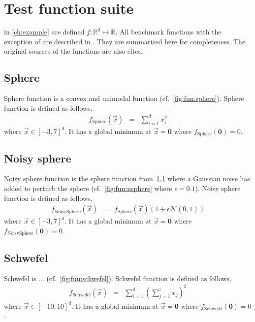 
\chapter{Test function suite}\label{app:fun} 
 in \cref{ch:example} are defined 
$f:\mathbb{R}^d\mapsto\mathbb{R}$.
All benchmark functions with the exception of \cite{citation_needed} are 
described in \cite{citation_needed}. They are summarized here for completeness. 
The original sources of the functions are also cited.

\section{Sphere }\label{app:fun:sphere}
Sphere function is a convex and unimodal function (cf.~\cref{fig:fun:sphere}). Sphere function is defined as follows,
\begin{eqnarray}
	f_{\textrm{Sphere}}(\vec{x})&=&\sum_{i=1}^d x_i^2
\end{eqnarray} where $\vec{x}\in[-3,7]^d$.
It has a global minimum at $\vec{x}=\textbf{0}$ where $f_{\textrm{Sphere}}(\textbf{0})=0$. 

\section{Noisy sphere}\label{app:fun:nsphere}
Noisy sphere function is the sphere function from~\cref{app:fun:sphere} where a Gaussian noise has added to perturb the sphere (cf.~\cref{fig:fun:nsphere} where $\epsilon=0.1$). Noisy sphere function is defined as follows,
\begin{eqnarray}
	f_{\textrm{NoisySphere}}(\vec{x})&=&f_{\textrm{Sphere}}(\vec{x})\left(1+\epsilon\mathcal{N}(0,1)\right)
\end{eqnarray} where $\vec{x}\in[-3,7]^d$.
It has a global minimum at $\vec{x}=\textbf{0}$ where $f_{\textrm{NoisySphere}}(\textbf{0})=0$.

\section{Schwefel}\label{app:fun:schwefel}
Schwefel is ... (cf.~\cref{fig:fun:schwefel}). Schwefel function is defined as follows,
\begin{eqnarray}
	f_{\textrm{Schwefel}}(\vec{x})&=&\sum_{i=1}^d\left(\sum_{j=1}^i x_j\right)^2
\end{eqnarray} where $\vec{x}\in[-10,10]^d$.
It has a global minimum at $\vec{x}=\textbf{0}$ where $f_{\textrm{Schwefel}}(\textbf{0})=0$.


